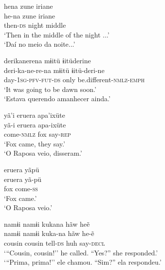 \documentclass[output=paper,
modfonts,nonflat
]{langsci/langscibook}
\begin{document}
\z

\ea   hena zune iriane \\[.3em]
\gll  he-na zune iriane \\
then-\textsc{ds} night middle\\
\glt  `Then in the middle of the night ...' \\
`Daí no meio da noite...' \\
\z

\ea   derikanerena mɨitü ɨitüderine \\[.3em]
\gll deri-ka-ne-re-na mɨitü ɨitü-deri-ne\\
day-\textsc{1sg-pfv-fut-ds} only be.different-\textsc{nmlz}-\textsc{emph}\\
\glt `It was going to be dawn soon.' \\
`Estava querendo amanhecer ainda.' \\
\z


\ea  yã'i eruera apa'ixüte \\[.3em]
\gll yã-i eruera apa-ixüte\\
come-\textsc{nmlz} fox say-\textsc{rep}\\
\glt   `Fox came, they say.' \\
`O Raposa veio, disseram.'  \\
\z

\ea  eruera yãpü \\[.3em]
\gll eruera yã-pü\\
fox come-\textsc{ss}\\
\glt  `Fox came.' \\
`O Raposa veio.'
\z

\newpage
\ea   namɨi namɨi kukana hãw heẽ \\[.3em]
\gll namɨi namɨi kuka-na hãw he-ẽ \\
cousin cousin tell-\textsc{ds} huh say-\textsc{decl}   \\
\glt  `{``}Cousin, cousin!'' he called. ``Yes?'' she responded.' \\
`{``}Prima, prima!'' ele chamou. ``Sim?'' ela respondeu.'
\z
\end{document}
